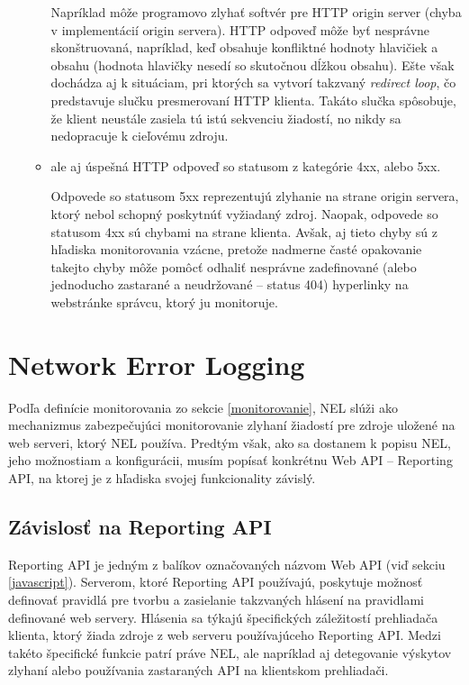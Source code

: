 \begin{enumerate}
\begin{itemize}
        Napríklad môže programovo zlyhať softvér pre HTTP origin server (chyba v implementácií origin servera).
        HTTP odpoveď môže byť nesprávne skonštruovaná, napríklad, keď obsahuje konfliktné hodnoty hlavičiek a obsahu (hodnota hlavičky  nesedí so skutočnou dĺžkou obsahu).  
        Ešte však dochádza aj k situáciam, pri ktorých sa vytvorí takzvaný \textit{redirect loop}, čo predstavuje slučku presmerovaní HTTP klienta. Takáto slučka spôsobuje, že klient neustále zasiela tú istú sekvenciu žiadostí, no nikdy sa nedopracuje k cieľovému zdroju.
        
        \item ale aj úspešná HTTP odpoveď so statusom z kategórie 4xx, alebo 5xx.

        Odpovede so statusom 5xx reprezentujú zlyhanie na strane origin servera, ktorý nebol schopný poskytnúť vyžiadaný zdroj.
        Naopak, odpovede so statusom 4xx sú chybami na strane klienta. 
        Avšak, aj tieto chyby sú z hľadiska monitorovania vzácne, pretože nadmerne časté opakovanie takejto chyby môže pomôcť odhaliť nesprávne zadefinované (alebo jednoducho zastarané a neudržované -- status 404) hyperlinky na webstránke správcu, ktorý ju monitoruje. 
    \end{itemize}
    
\end{enumerate}


\section{Network Error Logging}
\label{network-error-logging}

Podľa definície monitorovania zo sekcie \ref{monitorovanie}, NEL slúži ako mechanizmus
zabezpečujúci monitorovanie zlyhaní žiadostí pre zdroje uložené na web serveri, ktorý NEL používa.
Predtým však, ako sa dostanem k popisu NEL, jeho možnostiam a konfigurácii, musím popísať konkrétnu Web API -- Reporting API, na ktorej je z hľadiska svojej funkcionality závislý.

\subsection{Závislosť na Reporting API}
\label{reporting-api}

Reporting API je jedným z balíkov označovaných názvom Web API (viď sekciu \ref{javascript}).
Serverom, ktoré Reporting API používajú, poskytuje možnosť definovať pravidlá pre 
tvorbu a zasielanie takzvaných hlásení na pravidlami definované web servery.
Hlásenia sa týkajú špecifických záležitostí prehliadača klienta, ktorý žiada zdroje z web serveru používajúceho Reporting API.
Medzi takéto špecifické funkcie patrí práve NEL, ale napríklad aj detegovanie výskytov zlyhaní alebo používania zastaraných API na klientskom prehliadači.

